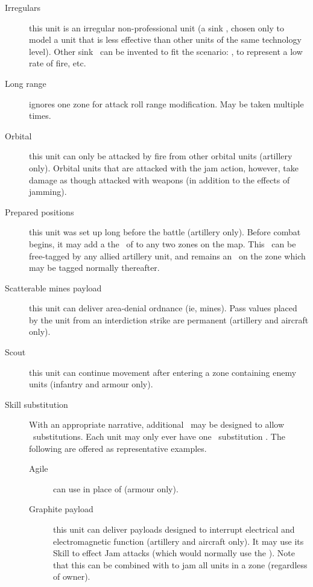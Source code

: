 \begin{description}
\item[Irregulars]
this unit is an irregular non-professional unit (a sink \Stunt, chosen only to model a unit that is less effective than other units of the same technology level). Other sink \Stunts\ can be invented to fit the scenario: , to represent a low rate of fire, etc.

\item[Long range]
ignores one zone for attack roll range modification. May be taken multiple times.

\item[Orbital]
this unit can only be attacked by fire from other orbital units (artillery only). Orbital units that are attacked with the jam action, however, take damage as though attacked with weapons (in addition to the effects of jamming).

\item[Prepared positions]
this unit was set up long before the battle (artillery only). Before combat begins, it may add a the \Aspect\ of  to any two zones on the map. This \Aspect\ can be free-tagged by any allied artillery unit, and remains an \Aspect\ on the zone which may be tagged normally thereafter.

\item[Scatterable mines payload]
this unit can deliver area-denial ordnance (ie, mines). Pass values placed by the unit from an interdiction strike are permanent (artillery and aircraft only).

\item[Scout]
this unit can continue movement after entering a zone containing enemy units (infantry and armour only).

\item[Skill substitution]
With an appropriate narrative, additional \Stunts\ may be designed to allow \Skill\ substitutions. Each unit may only ever have one \Skill\ substitution \Stunt. The following are offered as representative examples.

\begin{description}
\item[Agile]
can use  in place of  (armour only).

\item[Graphite payload]
this unit can deliver payloads designed to interrupt electrical and electromagnetic function (artillery and aircraft only).  It may use its  Skill to effect Jam attacks (which would normally use the ). Note that this can be combined with  to jam all units in a zone (regardless of owner).


\end{description}
\end{description}
